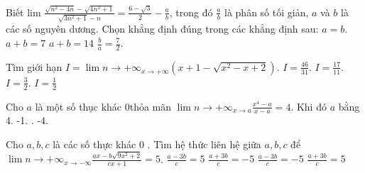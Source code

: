 \begin{ex}%
	Biết lim $\frac{\sqrt{n^2-4 n}-\sqrt{4 n^2+1}}{\sqrt{3 n^2+1}-n}=\frac{6-\sqrt{3}}{2}-\frac{a}{b}$, trong đó $\frac{a}{b}$ là phân số tối giản, $a$ và $b$ là các số nguyên dương. Chọn khẳng định đúng trong các khẳng định sau:
\choice
{ $a=b$.}
{ $a+b=7$}
{\True $a+b=14$}
{$\frac{b}{a}=\frac{7}{2}$.}
\end{ex}
\begin{ex}%
	Tìm giới hạn $I=\lim \limits{n \to +\infty}_{x \rightarrow+\infty}\left(x+1-\sqrt{x^2-x+2}\right)$.
\choice
{$I=\frac{46}{31}$.}
{$I=\frac{17}{11}$.}
{\True $I=\frac{3}{2}$.}
{$I=\frac{1}{2}$}
\end{ex}
\begin{ex}%
	Cho $a$ là một số thục khác 0thỏa mãn $\lim \limits{n \to +\infty}_{x \rightarrow a} \frac{x^4-a}{x-a}=4$.
	Khi đó $a$ bằng
\choice
{4.}
{-1.}
{.}
{-4.}
\end{ex}
\begin{ex}%
	Cho $a, b, c$ là các số thực khác 0 . Tìm hệ thức liên hệ giữa $a, b, c$ để $\lim \limits{n \to +\infty}_{x \rightarrow-\infty} \frac{a x-b \sqrt{9 x^2+2}}{c x+1}=5$.
\choice
{$\frac{a-3 b}{c}=5$}
{$\frac{a+3 b}{c}=-5$}
{$\frac{a-3 b}{c}=-5$}
{\True $\frac{a+3 b}{c}=5$}
\end{ex}
